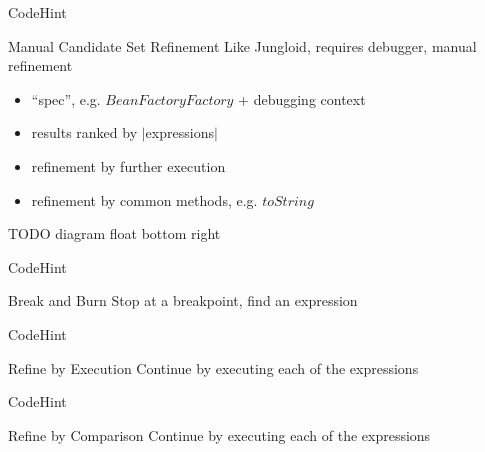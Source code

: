 \begin{frame}{CodeHint}
  \begin{block}{Manual Candidate Set Refinement}
    Like Jungloid, requires debugger, manual refinement

    \begin{itemize}
      \item ``spec'', e.g. $BeanFactoryFactory$ + debugging context
      \item results ranked by $|$expressions$|$
      \item refinement by further execution
      \item refinement by common methods, e.g. $toString$
    \end{itemize}

    TODO diagram float bottom right
  \end{block}
\end{frame}

\begin{frame}{CodeHint}
  \begin{block}{Break and Burn}
    Stop at a breakpoint, find an expression

    \begin{example}
      
    \end{example}
  \end{block}
\end{frame}

\begin{frame}{CodeHint}
  \begin{block}{Refine by Execution}
    Continue by executing each of the expressions

    \begin{example}
      
    \end{example}
  \end{block}
\end{frame}

\begin{frame}{CodeHint}
  \begin{block}{Refine by Comparison}
    Continue by executing each of the expressions

    \begin{example}
      
    \end{example}
  \end{block}
\end{frame}

